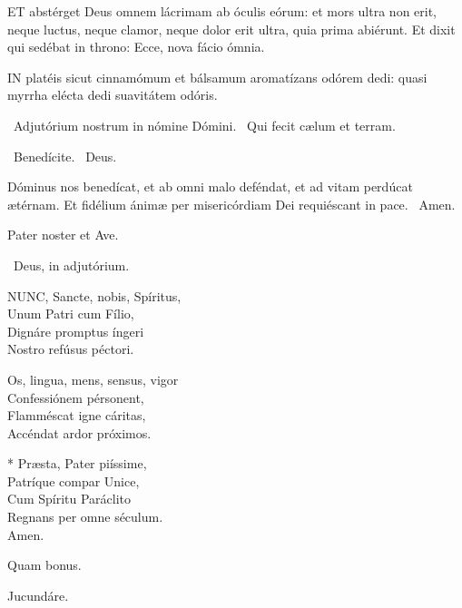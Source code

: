 
\lettrine[lines=2]{E}{T} abstérget Deus omnem lácrimam ab óculis eórum: et mors ultra non erit, neque luctus, neque clamor, neque dolor erit ultra, quia prima abiérunt. Et dixit qui sedébat in throno: Ecce, nova fácio ómnia.


\lettrine[lines=2]{I}{N} platéis sicut cinnamómum et bálsamum aromatízans odórem dedi: quasi myrrha elécta dedi suavitátem odóris.

\sectionornament

\V\ Adjutórium nostrum in nómine Dómini. \R\ Qui fecit cælum et terram.

\V\ Benedícite. \R\ Deus.

 Dóminus nos benedícat, et ab omni malo deféndat, et ad vitam perdúcat ætérnam. Et fidélium ánimæ per misericórdiam Dei requiéscant in pace. \R\ Amen.


\sectionornament


Pater noster et Ave.

\V\ Deus, in adjutórium.


\lettrine[lines=2]{N}{UNC}, Sancte, nobis, Spíritus,\\
Unum Patri cum Fílio,\\
Dignáre promptus íngeri\\
Nostro refúsus péctori.

Os, lingua, mens, sensus, vigor\\
Confessiónem pérsonent,\\
Flamméscat igne cáritas,\\
Accéndat ardor próximos.

* Præsta, Pater piíssime,\\
Patríque compar Unice,\\
Cum Spíritu Paráclito\\
Regnans per omne séculum.\\
Amen.

  Quam bonus. \textdagger


  Jucundáre.

